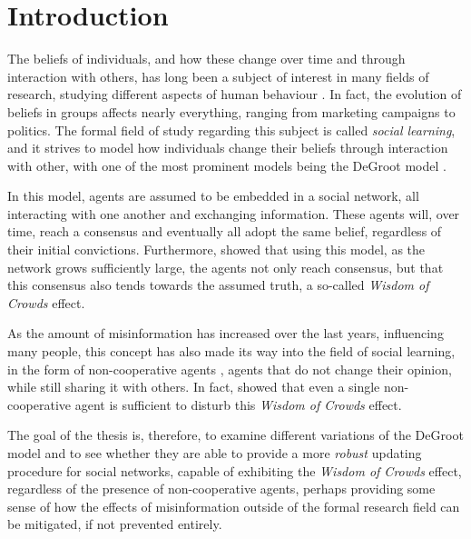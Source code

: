 \documentclass[a4paper, 12pt]{report}
\begin{document}
\newpage

\setcounter{page}{1}


\chapter{Introduction}

The beliefs of individuals, and how these change over time and through interaction with others, has long been a subject of interest in many fields of research, studying different aspects of human behaviour \parencite{reed2010sociallearning}. In fact, the evolution of beliefs in groups affects nearly everything, ranging from marketing campaigns to politics. The formal field of study regarding this subject is called \emph{social learning}, and it strives to model how individuals change their beliefs through interaction with other, with one of the most prominent models being the DeGroot model \parencite{degroot1974concensus}. 

\noindent In this model, agents are assumed to be embedded in a social network, all interacting with one another and exchanging information. These agents will, over time, reach a consensus and eventually all adopt the same belief, regardless of their initial convictions. Furthermore, \cite{golub2010naive} showed that using this model, as the network grows sufficiently large, the agents not only reach consensus, but that this consensus also tends towards the assumed truth, a so-called \emph{Wisdom of Crowds} effect.

\noindent As the amount of misinformation has increased over the last years, influencing many people, this concept has also made its way into the field of social learning, in the form of non-cooperative agents \parencite{amir2021robust}, agents that do not change their opinion, while still sharing it with others. In fact, \cite{amir2021robust} showed that even a single non-cooperative agent is sufficient to disturb this \emph{Wisdom of Crowds} effect.

\noindent The goal of the thesis is, therefore, to examine different variations of the DeGroot model and to see whether they are able to provide a more \emph{robust} \parencite{amir2021robust} updating procedure for social networks, capable of exhibiting the \emph{Wisdom of Crowds} effect, regardless of the presence of non-cooperative agents, perhaps providing some sense of how the effects of misinformation outside of the formal research field can be mitigated, if not prevented entirely.
\end{document}

